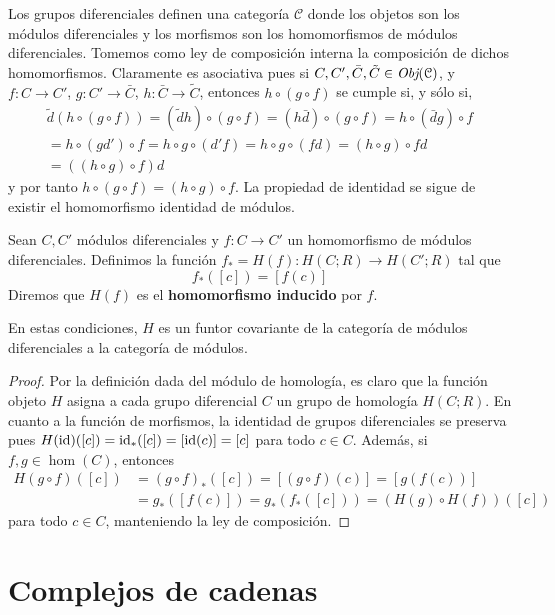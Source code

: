 Los grupos diferenciales definen una categoría $\mathcal{C}$ donde los objetos
son los módulos diferenciales y los morfismos son los homomorfismos de módulos
diferenciales. Tomemos como ley de composición interna la composición de dichos homomorfismos.
Claramente es asociativa pues si
$C, C', \bar{C}, \tilde{C}\in \operatorname{\textit{Obj}}(\mathcal{C})$, y $f\colon C \to C'$,
$g \colon C' \to \bar{C}$, $h\colon \bar{C}\to \tilde{C}$, entonces
$h \circ (g \circ f)$ se cumple si, y sólo si,
\begin{gather*}
	\tilde{d}(h \circ (g \circ f)) = (\tilde{d}h) \circ (g \circ f) = (h\bar{d}) \circ
	(g \circ f) = h \circ (\bar{d}g) \circ f \\ = h \circ (g d') \circ f = h \circ
	g \circ (d'f) = h \circ g \circ (fd) = (h \circ g) \circ fd \\ = ((h \circ g) \circ
	f) d
\end{gather*}
y por tanto $h \circ (g \circ f) = (h \circ g) \circ f$. La propiedad de identidad
se sigue de existir el homomorfismo identidad de módulos.

\begin{definicion}
	Sean $C, C'$ módulos diferenciales y $f:C \rightarrow C'$ un homomorfismo de módulos
	diferenciales. Definimos la función $f_{*}= H(f): H(C;R) \rightarrow H(C';R)$
	tal que
	\[
	f_{*}([c]) = [f(c)]
	\]
	Diremos que $H(f)$ es el \textbf{homomorfismo inducido} por $f$.
\end{definicion}
\begin{proposicion}
	En estas condiciones, $H$ es un funtor covariante de la categoría de módulos
	diferenciales a la categoría de módulos.
\end{proposicion}
\begin{proof}
	Por la definición dada del módulo de homología, es claro que la función objeto
	$H$ asigna a cada grupo diferencial $C$ un grupo de homología $H(C;R)$. En cuanto
	a la función de morfismos, la identidad de grupos diferenciales se preserva
	pues $H(\operatorname{id})([c]) = \operatorname{id}_{*}([c]) = [\operatorname{id}(c)] = [c]$ para todo $c \in C$. Además,
	si $f,g \in \hom(C)$, entonces
	\begin{align*}
		H(g \circ f)([c]) & = (g \circ f)_{*}([c]) = [(g \circ f)(c)] = [g (f (c))]        \\
		& = g_{*}([f(c)]) = g_{*}( f_{*}([c])) = (H(g) \circ H(f)) ([c])
	\end{align*}
	para todo $c \in C$, manteniendo la ley de composición.
\end{proof}

\section{Complejos de cadenas}

